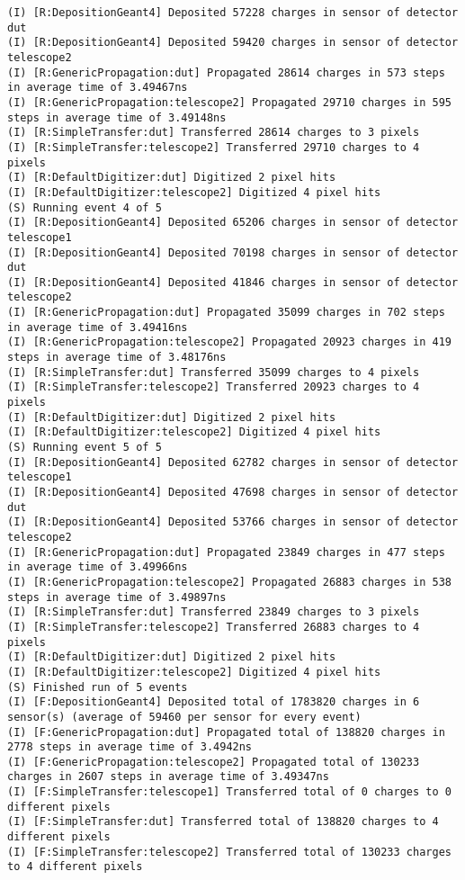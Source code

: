 \begin{lstlisting}[breaklines]
(I) [R:DepositionGeant4] Deposited 57228 charges in sensor of detector dut
(I) [R:DepositionGeant4] Deposited 59420 charges in sensor of detector telescope2
(I) [R:GenericPropagation:dut] Propagated 28614 charges in 573 steps in average time of 3.49467ns
(I) [R:GenericPropagation:telescope2] Propagated 29710 charges in 595 steps in average time of 3.49148ns
(I) [R:SimpleTransfer:dut] Transferred 28614 charges to 3 pixels
(I) [R:SimpleTransfer:telescope2] Transferred 29710 charges to 4 pixels
(I) [R:DefaultDigitizer:dut] Digitized 2 pixel hits
(I) [R:DefaultDigitizer:telescope2] Digitized 4 pixel hits
(S) Running event 4 of 5
(I) [R:DepositionGeant4] Deposited 65206 charges in sensor of detector telescope1
(I) [R:DepositionGeant4] Deposited 70198 charges in sensor of detector dut
(I) [R:DepositionGeant4] Deposited 41846 charges in sensor of detector telescope2
(I) [R:GenericPropagation:dut] Propagated 35099 charges in 702 steps in average time of 3.49416ns
(I) [R:GenericPropagation:telescope2] Propagated 20923 charges in 419 steps in average time of 3.48176ns
(I) [R:SimpleTransfer:dut] Transferred 35099 charges to 4 pixels
(I) [R:SimpleTransfer:telescope2] Transferred 20923 charges to 4 pixels
(I) [R:DefaultDigitizer:dut] Digitized 2 pixel hits
(I) [R:DefaultDigitizer:telescope2] Digitized 4 pixel hits
(S) Running event 5 of 5
(I) [R:DepositionGeant4] Deposited 62782 charges in sensor of detector telescope1
(I) [R:DepositionGeant4] Deposited 47698 charges in sensor of detector dut
(I) [R:DepositionGeant4] Deposited 53766 charges in sensor of detector telescope2
(I) [R:GenericPropagation:dut] Propagated 23849 charges in 477 steps in average time of 3.49966ns
(I) [R:GenericPropagation:telescope2] Propagated 26883 charges in 538 steps in average time of 3.49897ns
(I) [R:SimpleTransfer:dut] Transferred 23849 charges to 3 pixels
(I) [R:SimpleTransfer:telescope2] Transferred 26883 charges to 4 pixels
(I) [R:DefaultDigitizer:dut] Digitized 2 pixel hits
(I) [R:DefaultDigitizer:telescope2] Digitized 4 pixel hits
(S) Finished run of 5 events
(I) [F:DepositionGeant4] Deposited total of 1783820 charges in 6 sensor(s) (average of 59460 per sensor for every event)
(I) [F:GenericPropagation:dut] Propagated total of 138820 charges in 2778 steps in average time of 3.4942ns
(I) [F:GenericPropagation:telescope2] Propagated total of 130233 charges in 2607 steps in average time of 3.49347ns
(I) [F:SimpleTransfer:telescope1] Transferred total of 0 charges to 0 different pixels
(I) [F:SimpleTransfer:dut] Transferred total of 138820 charges to 4 different pixels
(I) [F:SimpleTransfer:telescope2] Transferred total of 130233 charges to 4 different pixels

\end{lstlisting}
